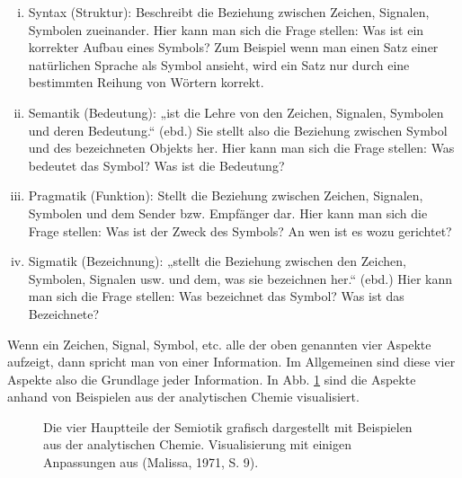  
\begin{enumerate}[(i)]

\item
Syntax (Struktur): Beschreibt die Beziehung zwischen Zeichen, Signalen, Symbolen zueinander. Hier kann man sich die Frage stellen: Was ist ein korrekter Aufbau eines Symbols? Zum Beispiel wenn man einen Satz einer natürlichen Sprache als Symbol ansieht, wird ein Satz nur durch eine bestimmten Reihung von Wörtern korrekt.


\item
Semantik (Bedeutung): „ist die Lehre von den Zeichen, Signalen, Symbolen und deren Bedeutung.“ (ebd.) Sie stellt also die Beziehung zwischen Symbol und des bezeichneten Objekts her. Hier kann man sich die Frage stellen: Was bedeutet das Symbol? Was ist die Bedeutung?


\item
Pragmatik (Funktion): Stellt die Beziehung zwischen Zeichen, Signalen, Symbolen und dem Sender bzw. Empfänger dar. Hier kann man sich die Frage stellen: Was ist der Zweck des Symbols? An wen ist es wozu gerichtet?


\item
Sigmatik (Bezeichnung): „stellt die Beziehung zwischen den Zeichen, Symbolen, Signalen usw. und dem, was sie bezeichnen her.“ (ebd.) Hier kann man sich die Frage stellen: Was bezeichnet das Symbol? Was ist das Bezeichnete?


\end{enumerate}
 
Wenn ein Zeichen, Signal, Symbol, etc. alle der oben genannten vier Aspekte aufzeigt, dann spricht man von einer Information. Im Allgemeinen sind diese vier Aspekte also die Grundlage jeder Information. In Abb. \ref{semiotik} sind die Aspekte anhand von Beispielen aus der analytischen Chemie visualisiert.

 
\begin{figure}[h!]
\centering
\advance\leftskip-2.5cm
\caption{ Die vier Hauptteile der Semiotik grafisch dargestellt mit Beispielen aus der analytischen Chemie. Visualisierung mit einigen Anpassungen aus (Malissa, 1971, S. 9). }\label{semiotik}
\end{figure}
 
